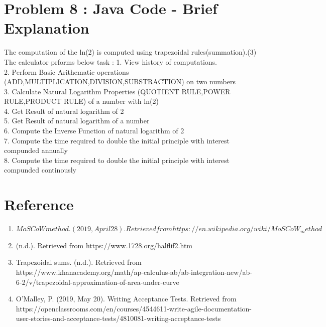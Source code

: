 \documentclass[12pt]{article}
\begin{document}
\section{Problem 8 : Java Code - Brief Explanation }

The computation of the ln(2) is computed using trapezoidal rules(summation).(3)\\
The calculator prforms below task :
1. View history of computations.\\
2. Perform Basic Arithematic operations (ADD,MULTIPLICATION,DIVISION,SUBSTRACTION) on two numbers\\
3. Calculate Natural Logarithm Properties (QUOTIENT RULE,POWER RULE,PRODUCT RULE) of a number with ln(2)\\
4. Get Result of natural logarithm of 2\\
5. Get Result of natural logarithm of a number\\
6. Compute the Inverse Function of natural logarithm of 2\\
7. Compute the time required to double the initial principle with interest compunded annually\\
8. Compute the time required to double the initial principle with interest compunded continously\\
\section{Reference}
\begin{enumerate}
\item$ MoSCoW method. (2019, April 28). Retrieved from https://en.wikipedia.org/wiki/MoSCoW_method$
\item (n.d.). Retrieved from https://www.1728.org/halflif2.htm
\item Trapezoidal sums. (n.d.). Retrieved from https://www.khanacademy.org/math/ap-calculus-ab/ab-integration-new/ab-6-2/v/trapezoidal-approximation-of-area-under-curve
\item O'Malley, P. (2019, May 20). Writing Acceptance Tests. Retrieved from https://openclassrooms.com/en/courses/4544611-write-agile-documentation-user-stories-and-acceptance-tests/4810081-writing-acceptance-tests
\end{enumerate}
 
\end{document}
